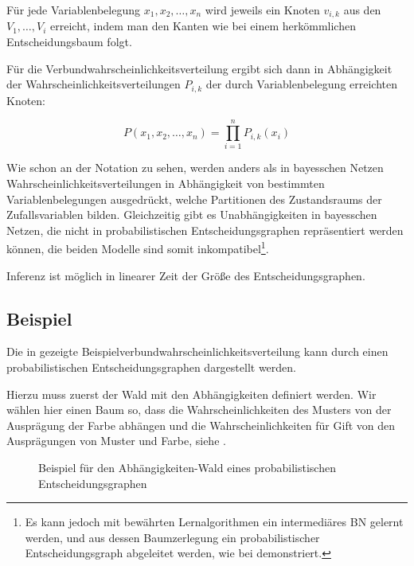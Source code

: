 \documentclass{llncs}
\begin{document}
Für jede Variablenbelegung $x_1, x_2, \dots, x_n$ wird jeweils ein Knoten $v_{i,k}$ aus den $V_1, \dots, V_i$ erreicht, indem man den Kanten wie bei einem herkömmlichen Entscheidungsbaum folgt. 

Für die Verbundwahrscheinlichkeitsverteilung ergibt sich dann in Abhängigkeit der Wahrscheinlichkeitsverteilungen $P_{i,k}$ der durch Variablenbelegung erreichten Knoten: 

\[P(x_1,x_2,\dots,x_n) = \prod_{i=1}^n P_{i,k}(x_i) \]

Wie schon an der Notation zu sehen, werden anders als in bayesschen Netzen Wahrscheinlichkeitsverteilungen in Abhängigkeit von bestimmten Variablenbelegungen ausgedrückt, welche Partitionen des Zustandsraums der Zufallsvariablen bilden. Gleichzeitig gibt es Unabhängigkeiten in bayesschen Netzen, die nicht in probabilistischen Entscheidungsgraphen repräsentiert werden können, die beiden Modelle sind somit inkompatibel\footnote{Es kann jedoch mit bewährten Lernalgorithmen ein intermediäres BN gelernt werden, und aus dessen Baumzerlegung ein probabilistischer Entscheidungsgraph abgeleitet werden, wie bei \cite{jaeger2006learning} demonstriert. }. 

Inferenz ist möglich in linearer Zeit der Größe des Entscheidungsgraphen. 

\subsection{Beispiel}

Die in  gezeigte Beispielverbundwahrscheinlichkeitsverteilung kann durch einen probabilistischen Entscheidungsgraphen dargestellt werden. 

Hierzu muss zuerst der Wald mit den Abhängigkeiten definiert werden. Wir wählen hier einen Baum so, dass die Wahrscheinlichkeiten des Musters von der Ausprägung der Farbe abhängen und die Wahrscheinlichkeiten für Gift von den Ausprägungen von Muster und Farbe, siehe . 

\begin{figure}[H]
\caption{\label{fig:pdgforest}Beispiel für den Abhängigkeiten-Wald eines probabilistischen Entscheidungsgraphen}
\centering
{}
\end{figure}
\end{document}
